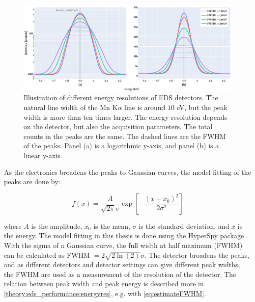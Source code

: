 \begin{figure}[ht]
    \centering
    \includegraphics[width=0.95\linewidth]{figures/eds_energyResolutionsMnKa.pdf}
    \caption{
        Illustration of different energy resolutions of EDS detectors.
        The natural line width of the Mn K$\alpha$ line is around $10$ eV, but the peak width is more than ten times larger.
        The energy resolution depends on the detector, but also the acquisition parameters.
        The total counts in the peaks are the same.
        The dashed lines are the FWHM of the peaks.
        Panel (a) is a logarithmic y-axis, and panel (b) is a linear y-axis.
    }
    \label{fig:theory:energy_resolution}
\end{figure}





As the electronics broadens the peaks to Gaussian curves, the model fitting of the peaks are done by:

\begin{equation}
    \label{eq:gaussian}
    f(x) = \frac{A}{\sqrt{2\pi}\sigma}\exp\left[{-\frac{(x-x_0)^2}{2\sigma^2}}\right]
\end{equation}

where $A$ is the amplitude, $x_0$ is the mean, $\sigma$ is the standard deviation, and $x$ is the energy.
The model fitting in this thesis is done using the HyperSpy package \cite{hyperspy_1.7.1}.
With the sigma of a Gaussian curve, the full width at half maximum (FWHM) can be calculated as FWHM $= 2\sqrt{2\ln(2)}\sigma$.
The detector broadens the peaks, and as different detectors and detector settings can give different peak widths, the FWHM are used as a measurement of the resolution of the detector.
The relation between peak width and peak energy is described more in \cref{theory:eds_performance:energyres}, e.g. with \cref{eq:estimateFWHM}.































